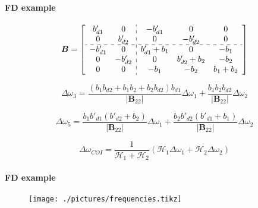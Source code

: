 \begin{frame}{\secname}
	\framesubtitle{FD example}
\begin{equation}
		\boldsymbol{B}=
		\left[
		\begin{array}{cc:ccc}
				b'_{d1} & 0 & -b'_{d1} & 0 & 0  \\
				0 & b'_{d2} & 0 & -b'_{d2} & 0 \\
			\hdashline
			-b'_{d1} & 0 & b'_{d1}+b_1 & 0 & -b_1 \\
			0 & -b'_{d2} & 0 & b'_{d2}+b_2 & -b_2 \\
			0 & 0 & -b_{1} & -b_{2} & b_{1}+b_2 \\
		\end{array}
		\right]
\end{equation}

\begin{equation}
		\Delta \omega_3 = \frac{(b_1b_{d2}+b_1b_2+b_2b_{d2})b_{d1}}{|\boldsymbol{B}_{22}|}\Delta\omega_1 +\frac{b_1b_2b_{d2}}{|\boldsymbol{B}_{22}|}\Delta\omega_2
\end{equation}

\begin{equation}
		\Delta \omega_5 = \frac{b_1b'_{d1}(b'_{d2}+b_2)}{|\boldsymbol{B}_{22}|}\Delta \omega_1 + \frac{b_2b'_{d2}(b'_{d1}+b_1)}{|\boldsymbol{B}_{22}|}\Delta \omega_2
\end{equation}

\begin{equation}
		\Delta \omega_{COI} = \frac{1}{\mathcal{H}_1+\mathcal{H}_2}(\mathcal{H}_1\Delta \omega_1 + \mathcal{H}_2\Delta \omega_2)
\end{equation}

\end{frame}

\begin{frame}{\secname}
	\framesubtitle{FD example}
	\begin{figure}
		\texttt{[image: ./pictures/frequencies.tikz]}
	\end{figure}
\end{frame}

